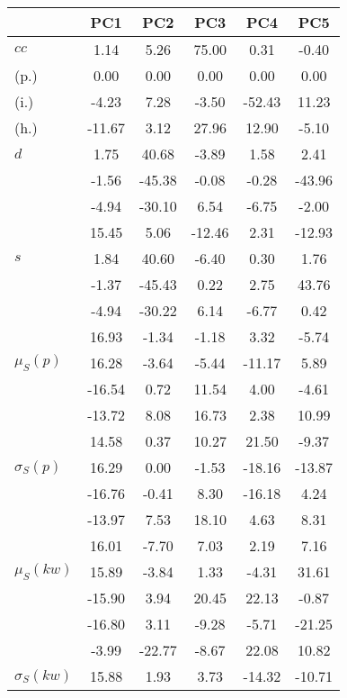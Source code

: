 \begin{table}[h!]
\begin{center}
\begin{tabular}{| l | c | c | c | c | c |}\hline
 & PC1 & PC2 & PC3 & PC4 & PC5 \\\hline
$cc$ & 1.14  & 5.26  & 75.00  & 0.31  & -0.40 \\\hline
(p.) & 0.00  & 0.00  & 0.00  & 0.00  & 0.00 \\\hline
(i.) & -4.23  & 7.28  & -3.50  & -52.43  & 11.23 \\\hline
(h.) & -11.67  & 3.12  & 27.96  & 12.90  & -5.10 \\\hline
$d$ & 1.75  & 40.68  & -3.89  & 1.58  & 2.41 \\\hline
 & -1.56  & -45.38  & -0.08  & -0.28  & -43.96 \\\hline
 & -4.94  & -30.10  & 6.54  & -6.75  & -2.00 \\\hline
 & 15.45  & 5.06  & -12.46  & 2.31  & -12.93 \\\hline
$s$ & 1.84  & 40.60  & -6.40  & 0.30  & 1.76 \\\hline
 & -1.37  & -45.43  & 0.22  & 2.75  & 43.76 \\\hline
 & -4.94  & -30.22  & 6.14  & -6.77  & 0.42 \\\hline
 & 16.93  & -1.34  & -1.18  & 3.32  & -5.74 \\\hline
$\mu_S(p)$ & 16.28  & -3.64  & -5.44  & -11.17  & 5.89 \\\hline
 & -16.54  & 0.72  & 11.54  & 4.00  & -4.61 \\\hline
 & -13.72  & 8.08  & 16.73  & 2.38  & 10.99 \\\hline
 & 14.58  & 0.37  & 10.27  & 21.50  & -9.37 \\\hline
$\sigma_S(p)$ & 16.29  & 0.00  & -1.53  & -18.16  & -13.87 \\\hline
 & -16.76  & -0.41  & 8.30  & -16.18  & 4.24 \\\hline
 & -13.97  & 7.53  & 18.10  & 4.63  & 8.31 \\\hline
 & 16.01  & -7.70  & 7.03  & 2.19  & 7.16 \\\hline
$\mu_S(kw)$ & 15.89  & -3.84  & 1.33  & -4.31  & 31.61 \\\hline
 & -15.90  & 3.94  & 20.45  & 22.13  & -0.87 \\\hline
 & -16.80  & 3.11  & -9.28  & -5.71  & -21.25 \\\hline
 & -3.99  & -22.77  & -8.67  & 22.08  & 10.82 \\\hline
$\sigma_S(kw)$ & 15.88  & 1.93  & 3.73  & -14.32  & -10.71 \\\hline

\end{tabular}
\end{center}
\end{table}
